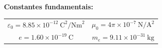 \documentclass[11pt,a4paper,final,addpoints]{exam}
\begin{document}
\noindent\textbf{Constantes fundamentais:}
\begin{center}
\begin{tabular}{cc}
$\varepsilon_0 = 8.85\times10^{-12}~\text{C}^2/\text{Nm}^2$ & $\mu_0 = 4\pi\times10^{-7}~\text{N}/\text{A}^2$ \\ 
$e=1.60\times10^{-19}~\text{C}$ & $m_e=9.11\times10^{-31}~\text{kg}$ \\ 
\end{tabular} 
\end{center}


\boxedpoints
\pointsinmargin
\newpage
\begin{questions}



\newpage


\end{questions}
\end{document}
